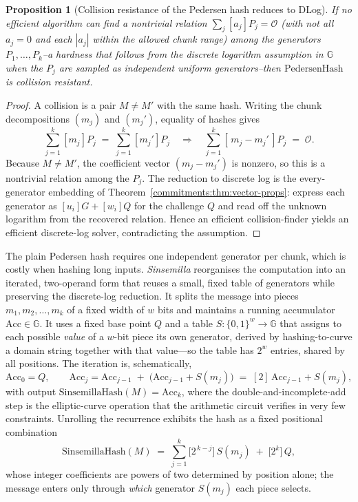 \documentclass[11pt,a4paper]{article}
\newtheorem{proposition}[theorem]{Proposition}
\theoremstyle{definition}
\theoremstyle{remark}
\newcommand{\G}{\ensuremath{\mathbb{G}}}
\begin{document}
\begin{proposition}[Collision resistance of the Pedersen hash reduces to DLog]\label{commitments:prop:pedersen-hash-cr}
If no efficient algorithm can find a nontrivial relation \(\sum_j [a_j] P_j = \mathcal{O}\) (with not all \(a_j = 0\) and each \(|a_j|\) within the allowed chunk range) among the generators \(P_1, \dots, P_k\)--a hardness that follows from the discrete logarithm assumption in \(\G\) when the \(P_j\) are sampled as independent uniform generators--then \(\mathrm{PedersenHash}\) is collision resistant.
\end{proposition}

\begin{proof}
A collision is a pair \(M \neq M'\) with the same hash. Writing the chunk decompositions \((m_j)\) and \((m_j')\), equality of hashes gives
\[
  \sum_{j=1}^k [m_j] P_j \;=\; \sum_{j=1}^k [m_j'] P_j
  \quad\Longrightarrow\quad
  \sum_{j=1}^k [\,m_j - m_j'\,] P_j \;=\; \mathcal{O}.
\]
Because \(M \neq M'\), the coefficient vector \((m_j - m_j')\) is nonzero, so this is a nontrivial relation among the \(P_j\). The reduction to discrete log is the every-generator embedding of Theorem~\ref{commitments:thm:vector-props}: express each generator as \([u_i]G + [w_i]Q\) for the challenge \(Q\) and read off the unknown logarithm from the recovered relation. Hence an efficient collision-finder yields an efficient discrete-log solver, contradicting the assumption.
\end{proof}

The plain Pedersen hash requires one independent generator per chunk, which is costly when hashing long inputs. \emph{Sinsemilla} reorganises the computation into an iterated, two-operand form that reuses a small, fixed table of generators while preserving the discrete-log reduction. It splits the message into pieces \(m_1, m_2, \dots, m_k\) of a fixed width of \(w\) bits and maintains a running accumulator \(\mathrm{Acc} \in \G\). It uses a fixed base point \(Q\) and a table \(S \colon \{0,1\}^w \to \G\) that assigns to each possible \emph{value} of a \(w\)-bit piece its own generator, derived by hashing-to-curve a domain string together with that value---so the table has \(2^w\) entries, shared by all positions. The iteration is, schematically,
\[
  \mathrm{Acc}_0 = Q,
  \qquad
  \mathrm{Acc}_j = \mathrm{Acc}_{j-1} \;+\; \bigl(\mathrm{Acc}_{j-1} + S(m_j)\bigr) \;=\; [2]\,\mathrm{Acc}_{j-1} + S(m_j),
\]
with output \(\mathrm{SinsemillaHash}(M) = \mathrm{Acc}_k\), where the double-and-incomplete-add step is the elliptic-curve operation that the arithmetic circuit verifies in very few constraints. Unrolling the recurrence exhibits the hash as a fixed positional combination
\[
  \mathrm{SinsemillaHash}(M) \;=\; \sum_{j=1}^{k} \bigl[2^{\,k-j}\bigr]\, S(m_j) \;+\; \bigl[2^{k}\bigr]\, Q,
\]
whose integer coefficients are powers of two determined by position alone; the message enters only through \emph{which} generator \(S(m_j)\) each piece selects.
\end{document}
